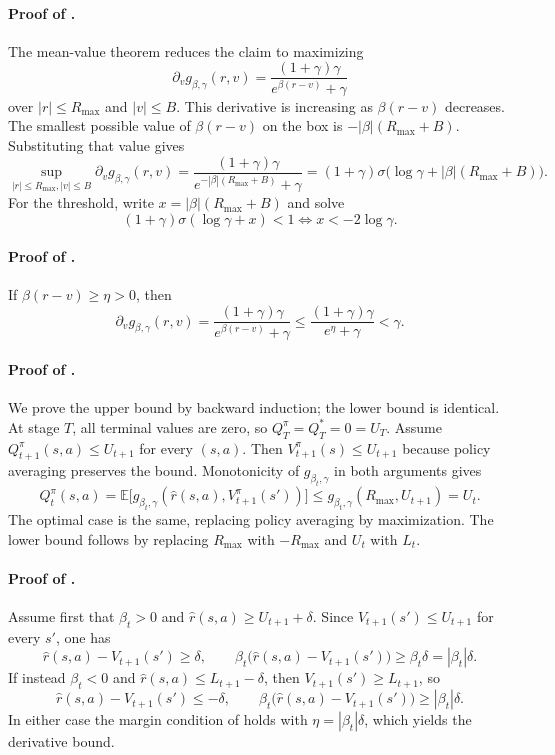 \documentclass{article}
\theoremstyle{remark}
\newcommand{\E}{\mathbb{E}}
\begin{document}
\paragraph{Proof of .}
The mean-value theorem reduces the claim to maximizing
\[
\partial_v g_{\beta,\gamma}(r,v)=\frac{(1+\gamma)\gamma}{e^{\beta(r-v)}+\gamma}
\]
over $|r|\le R_{\max}$ and $|v|\le B$.
This derivative is increasing as $\beta(r-v)$ decreases.
The smallest possible value of $\beta(r-v)$ on the box is $-|\beta|(R_{\max}+B)$.
Substituting that value gives
\[
\sup_{|r|\le R_{\max},|v|\le B}\partial_v g_{\beta,\gamma}(r,v)
=
\frac{(1+\gamma)\gamma}{e^{-|\beta|(R_{\max}+B)}+\gamma}
=(1+\gamma)\sigma\!\bigl(\log\gamma+|\beta|(R_{\max}+B)\bigr).
\]
For the threshold, write $x=|\beta|(R_{\max}+B)$ and solve
\[
(1+\gamma)\sigma(\log\gamma+x)<1
\iff x<-2\log\gamma.
\]

\paragraph{Proof of .}
If $\beta(r-v)\ge \eta>0$, then
\[
\partial_v g_{\beta,\gamma}(r,v)=\frac{(1+\gamma)\gamma}{e^{\beta(r-v)}+\gamma}\le \frac{(1+\gamma)\gamma}{e^{\eta}+\gamma}<\gamma.
\]

\paragraph{Proof of .}
We prove the upper bound by backward induction; the lower bound is identical.
At stage $T$, all terminal values are zero, so $Q_T^\pi=Q_T^*=0=U_T$.
Assume $Q_{t+1}^\pi(s,a)\le U_{t+1}$ for every $(s,a)$.
Then $V_{t+1}^\pi(s)\le U_{t+1}$ because policy averaging preserves the bound.
Monotonicity of $g_{\beta_t,\gamma}$ in both arguments gives
\[
Q_t^\pi(s,a)=\E\bigl[g_{\beta_t,\gamma}(\hat r(s,a),V_{t+1}^\pi(s'))\bigr]\le g_{\beta_t,\gamma}(R_{\max},U_{t+1})=U_t.
\]
The optimal case is the same, replacing policy averaging by maximization.
The lower bound follows by replacing $R_{\max}$ with $-R_{\max}$ and $U_t$ with $L_t$.

\paragraph{Proof of .}
Assume first that $\beta_t>0$ and $\hat r(s,a)\ge U_{t+1}+\delta$. Since $V_{t+1}(s')\le U_{t+1}$ for every $s'$, one has
\[
\hat r(s,a)-V_{t+1}(s')\ge \delta,
\qquad
\beta_t\bigl(\hat r(s,a)-V_{t+1}(s')\bigr)\ge \beta_t\delta=|\beta_t|\delta.
\]
If instead $\beta_t<0$ and $\hat r(s,a)\le L_{t+1}-\delta$, then $V_{t+1}(s')\ge L_{t+1}$, so
\[
\hat r(s,a)-V_{t+1}(s')\le -\delta,
\qquad
\beta_t\bigl(\hat r(s,a)-V_{t+1}(s')\bigr)\ge |\beta_t|\delta.
\]
In either case the margin condition of  holds with $\eta=|\beta_t|\delta$, which yields the derivative bound.
\end{document}
